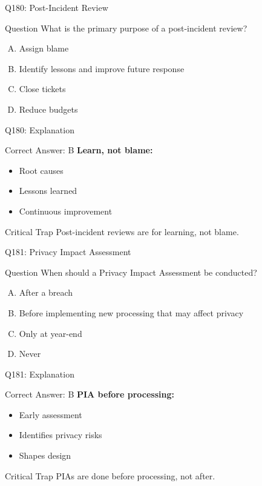 \documentclass{beamer}
\begin{document}
	\begin{frame}{Q180: Post-Incident Review}
		\begin{block}{Question}
			What is the primary purpose of a post-incident review?
		\end{block}
		\begin{enumerate}[(A)]
			\item Assign blame
			\item Identify lessons and improve future response
			\item Close tickets
			\item Reduce budgets
		\end{enumerate}
	\end{frame}
	
	\begin{frame}{Q180: Explanation}
		\begin{block}{Correct Answer: B}
			\textbf{Learn, not blame:}
			\begin{itemize}
				\item Root causes
				\item Lessons learned
				\item Continuous improvement
			\end{itemize}
		\end{block}
		\begin{alertblock}{Critical Trap}
			Post-incident reviews are for learning, not blame.
		\end{alertblock}
	\end{frame}
	
	\begin{frame}{Q181: Privacy Impact Assessment}
		\begin{block}{Question}
			When should a Privacy Impact Assessment be conducted?
		\end{block}
		\begin{enumerate}[(A)]
			\item After a breach
			\item Before implementing new processing that may affect privacy
			\item Only at year-end
			\item Never
		\end{enumerate}
	\end{frame}
	
	\begin{frame}{Q181: Explanation}
		\begin{block}{Correct Answer: B}
			\textbf{PIA before processing:}
			\begin{itemize}
				\item Early assessment
				\item Identifies privacy risks
				\item Shapes design
			\end{itemize}
		\end{block}
		\begin{alertblock}{Critical Trap}
			PIAs are done before processing, not after.
		\end{alertblock}
	\end{frame}
	
\end{document}
